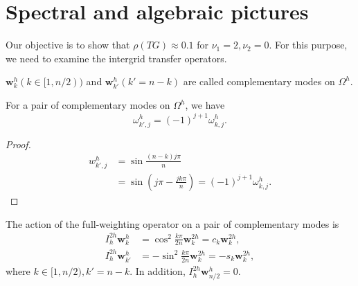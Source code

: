 \section{Spectral and algebraic pictures}
\label{sec:spectr-algebr-pict}

\begin{rem}
  Our objective is to show that $\rho(TG)\approx 0.1$
for $\nu_1=2,\nu_2=0$.
For this purpose, 
we need to examine the intergrid transfer operators.
\end{rem}
\begin{defn}
  $\mathbf{w}^h_k(k\in [1,n/2))$ and $\mathbf{w}^h_{k'}(k'=n-k)$
are called complementary modes on $\Omega^h$. 
\end{defn}

\begin{prop}
  \label{prop:comolementary}
  For a pair of complementary modes on $\Omega^h$,
we have
\begin{equation}
  \omega_{k',j}^h=(-1)^{j+1}\omega^h_{k,j}.
\end{equation}
\end{prop}

\begin{proof}
  \begin{equation}
    \begin{aligned}
      w^h_{k',j}&=\sin \frac{(n-k)j\pi}{n}\\
&=\sin(j\pi-\frac{jk\pi}{n})
      =(-1)^{j+1}\omega^h_{k,j}.
    \end{aligned}
\end{equation}
\end{proof}


\begin{lem}
  The action of the full-weighting operator on a pair of complementary
modes is
\begin{align}
  I^{2h}_h\mathbf{w}^h_k&=\cos^2\frac{k\pi}{2n}\mathbf{w}^{2h}_k
=c_k\mathbf{w}_k^{2h},\\
  I^{2h}_h\mathbf{w}^h_{k'}&=-\sin^2\frac{k\pi}{2n}\mathbf{w}^{2h}_k
=-s_k\mathbf{w}_k^{2h},
\end{align}
where $k\in [1,n/2),k'=n-k.$
In addition, $ I^{2h}_h\mathbf{w}^h_{n/2}=0$.
\end{lem}

